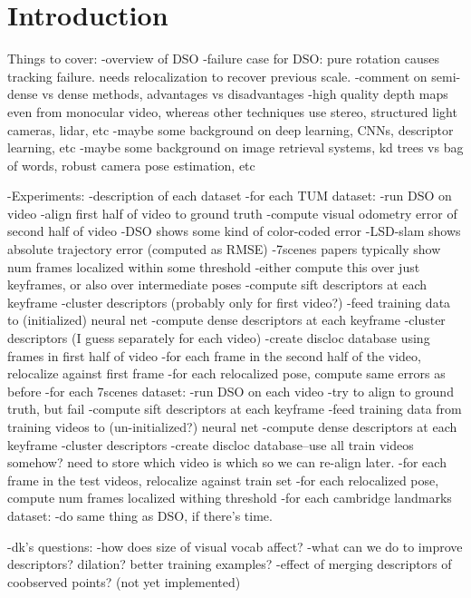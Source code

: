 \graphicspath{{introduction/}}

\chapter{Introduction}
\label{cha:introduction}


Things to cover:
-overview of DSO
-failure case for DSO: pure rotation causes tracking failure. needs relocalization to recover previous scale.
-comment on semi-dense vs dense methods, advantages vs disadvantages
	-high quality depth maps even from monocular video, whereas other techniques use stereo, structured light cameras, lidar, etc
-maybe some background on deep learning, CNNs, descriptor learning, etc
-maybe some background on image retrieval systems, kd trees vs bag of words, robust camera pose estimation, etc


-Experiments:
-description of each dataset
-for each TUM dataset:
	-run DSO on video
	-align first half of video to ground truth
	-compute visual odometry error of second half of video
		-DSO shows some kind of color-coded error
		-LSD-slam shows absolute trajectory error (computed as RMSE)
		-7scenes papers typically show num frames localized within some threshold
		-either compute this over just keyframes, or also over intermediate poses
	-compute sift descriptors at each keyframe
		-cluster descriptors (probably only for first video?)
	-feed training data to (initialized) neural net
	-compute dense descriptors at each keyframe
	    -cluster descriptors (I guess separately for each video)
	-create discloc database using frames in first half of video
    -for each frame in the second half of the video, relocalize against first frame
	    -for each relocalized pose, compute same errors as before
-for each 7scenes dataset:
	-run DSO on each video
	-try to align to ground truth, but fail
	-compute sift descriptors at each keyframe
	-feed training data from training videos to (un-initialized?) neural net
	-compute dense descriptors at each keyframe
	-cluster descriptors
	-create discloc database--use all train videos somehow? need to store which video is which so we can re-align later.
	-for each frame in the test videos, relocalize against train set
	    -for each relocalized pose, compute num frames localized withing threshold
-for each cambridge landmarks dataset:
	-do same thing as DSO, if there's time.

	
	-dk's questions:
		-how does size of visual vocab affect?
		-what can we do to improve descriptors? dilation? better training examples?
		-effect of merging descriptors of coobserved points? (not yet implemented)

\cleardoublepage
